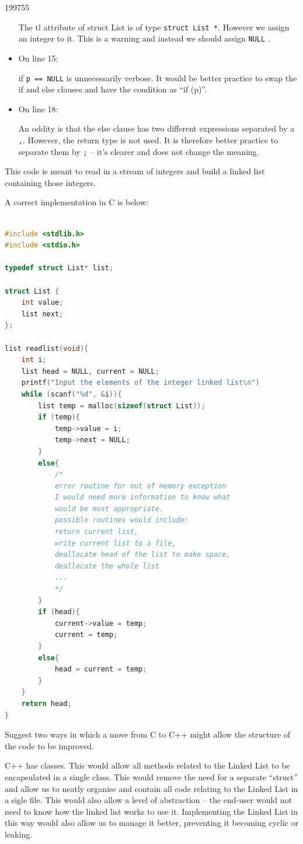 \documentclass[10pt,\jkfside,a4paper]{article}
\begin{document}
\begin{examquestion}{1997}{5}{5}
\begin{itemize}
The tl attribute of struct List is of type \texttt{struct List *}. However
we assign an integer to it. This is a warning and instead we should assign
\texttt{NULL} .

\item On line 15:

if \texttt{p == NULL} is unnecessarily verbose. It would be better practice
to swap the if and else clauses and have the condition as ``if (p)''.

\item On line 18:

An oddity is that the  else clause has two different expressions separated
by a \texttt{,}. However, the return type is not used. It is therefore better
practice to separate them by \texttt{;} -- it's clearer and does not change the
meaning.

\end{itemize}

This code is meant to read in a stream of integers and build a linked list
containing those integers.

A correct implementation in C is below:

\begin{lstlisting}[language=C]

#include <stdlib.h>
#include <stdio.h>

typedef struct List* list;

struct List {
	int value;
	list next;
};

list readlist(void){
	int i;
	list head = NULL, current = NULL;
	printf("Input the elements of the integer linked list\n")
	while (scanf("%d", &i)){
		list temp = malloc(sizeof(struct List));
		if (temp){
			temp->value = i;
			temp->next = NULL;
		}
		else{
			/*
			error routine for out of memory exception
			I would need more information to know what
			would be most appropriate.
			possible routines would include:
			return current list,
			write current list to a file,
			deallocate head of the list to make space,
			deallocate the whole list
			...
			*/
		}
		if (head){
			current->value = temp;
			current = temp;
		}
		else{
			head = current = temp;
		}
	}
	return head;
}

\end{lstlisting}

Suggest two ways in which a move from C to C++ might allow the structure of
the code to be improved.

C++ has classes. This would allow all methods related to the Linked List to
be encapsulated in a single class. This would remove the need for a separate
``struct'' and allow us to neatly organise and contain all code relating to
the Linked List in a sigle file. This would also allow a level of
abstraction -- the end-user would not need to know how the linked list works
to use it. Implementing the Linked List in this way would also allow us to
manage it better, preventing it becoming cyclic or leaking.


\end{examquestion}
\end{document}

